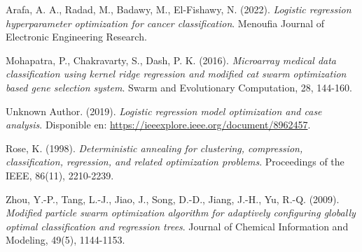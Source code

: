 \documentclass{book}
\begin{document}
\begin{thebibliography}{}
	Arafa, A. A., Radad, M., Badawy, M., El-Fishawy, N. (2022). 
	\textit{Logistic regression hyperparameter optimization for cancer classification}. 
	Menoufia Journal of Electronic Engineering Research.
	
	Mohapatra, P., Chakravarty, S., Dash, P. K. (2016). 
	\textit{Microarray medical data classification using kernel ridge regression and modified cat swarm optimization based gene selection system}. 
	Swarm and Evolutionary Computation, 28, 144-160.
	
	Unknown Author. (2019). 
	\textit{Logistic regression model optimization and case analysis}. 
	Disponible en: \url{https://ieeexplore.ieee.org/document/8962457}.
	
	Rose, K. (1998). 
	\textit{Deterministic annealing for clustering, compression, classification, regression, and related optimization problems}. 
	Proceedings of the IEEE, 86(11), 2210-2239.
	
	Zhou, Y.-P., Tang, L.-J., Jiao, J., Song, D.-D., Jiang, J.-H., Yu, R.-Q. (2009). 
	\textit{Modified particle swarm optimization algorithm for adaptively configuring globally optimal classification and regression trees}. 
	Journal of Chemical Information and Modeling, 49(5), 1144-1153.
	
\end{thebibliography}
\end{document}
